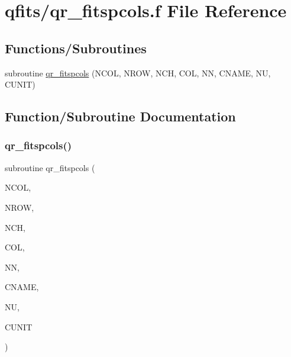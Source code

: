 \hypertarget{qr__fitspcols_8f}{}\section{qfits/qr\+\_\+fitspcols.f File Reference}
\label{qr__fitspcols_8f}
\subsection*{Functions/\+Subroutines}
\begin{DoxyCompactItemize}
\item 
subroutine \hyperlink{qr__fitspcols_8f_a0724b41ae1e03d3099bb8575a0c75646}{qr\+\_\+fitspcols} (N\+C\+OL, N\+R\+OW, N\+CH, C\+OL, NN, C\+N\+A\+ME, NU, C\+U\+N\+IT)
\end{DoxyCompactItemize}


\subsection{Function/\+Subroutine Documentation}
\mbox{\label{qr__fitspcols_8f_a0724b41ae1e03d3099bb8575a0c75646}} 
\subsubsection{\texorpdfstring{qr\+\_\+fitspcols()}{qr\_fitspcols()}}
{\footnotesize\ttfamily subroutine qr\+\_\+fitspcols (\begin{DoxyParamCaption}\item[{integer}]{N\+C\+OL,  }\item[{integer}]{N\+R\+OW,  }\item[{integer}]{N\+CH,  }\item[{character$\ast$(nch)}]{C\+OL,  }\item[{integer}]{NN,  }\item[{character$\ast$(nn)}]{C\+N\+A\+ME,  }\item[{integer}]{NU,  }\item[{character$\ast$(nu)}]{C\+U\+N\+IT }\end{DoxyParamCaption})}

